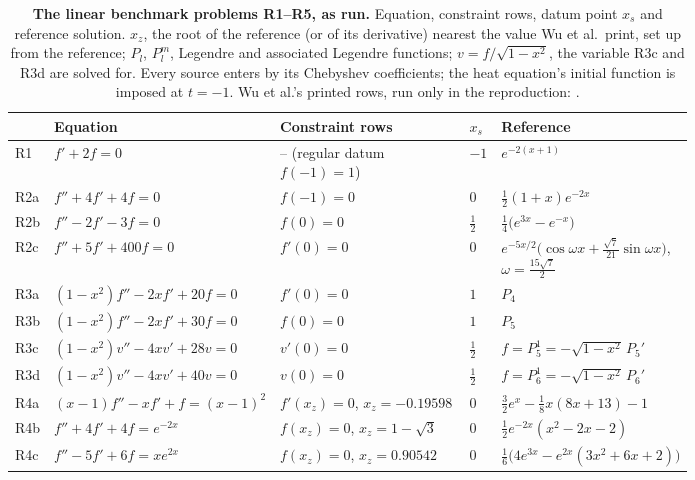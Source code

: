 \begin{table}[htbp]
    \centering
    \caption[The linear benchmark problems R1--R5]{\textbf{The linear benchmark problems R1--R5, as run.} Equation, constraint rows, datum point $x_s$ and reference solution. $x_z$, the root of the reference (or of its derivative) nearest the value Wu et al.\ print, set up from the reference; $P_l$, $P_l^m$, Legendre and associated Legendre functions; $v=f/\sqrt{1-x^2}$, the variable R3c and R3d are solved for. Every source enters by its Chebyshev coefficients; the heat equation's initial function is imposed at $t=-1$. Wu et al.'s printed rows, run only in the reproduction: .}
    \label{tab:catalogue-linear}
    \footnotesize
    \begin{tabular}{@{}l p{0.26\linewidth} p{0.29\linewidth} l p{0.24\linewidth}@{}}
        \toprule
        & Equation & Constraint rows & $x_s$ & Reference \\
        \midrule
        R1  & $f' + 2f = 0$ & -- (regular datum $f(-1)=1$) & $-1$ & $e^{-2(x+1)}$ \\
        R2a & $f'' + 4f' + 4f = 0$ & $f(-1) = 0$ & $0$ & $\tfrac12(1+x)e^{-2x}$ \\
        R2b & $f'' - 2f' - 3f = 0$ & $f(0) = 0$ & $\tfrac12$ & $\tfrac14\bigl(e^{3x} - e^{-x}\bigr)$ \\
        R2c & $f'' + 5f' + 400f = 0$ & $f'(0) = 0$ & $0$ & $e^{-5x/2}\bigl(\cos\omega x + \tfrac{\sqrt7}{21}\sin\omega x\bigr)$, $\omega = \tfrac{15\sqrt7}{2}$ \\
        R3a & $(1-x^2)f'' - 2xf' + 20f = 0$ & $f'(0) = 0$ & $1$ & $P_4$ \\
        R3b & $(1-x^2)f'' - 2xf' + 30f = 0$ & $f(0) = 0$ & $1$ & $P_5$ \\
        R3c & $(1-x^2)v'' - 4xv' + 28v = 0$ & $v'(0) = 0$ & $\tfrac12$ & $f = P_5^1 = -\sqrt{1-x^2}\,P_5'$ \\
        R3d & $(1-x^2)v'' - 4xv' + 40v = 0$ & $v(0) = 0$ & $\tfrac12$ & $f = P_6^1 = -\sqrt{1-x^2}\,P_6'$ \\
        R4a & $(x-1)f'' - xf' + f = (x-1)^2$ & $f'(x_z) = 0$, $x_z = -0.19598$ & $0$ & $\tfrac32e^{x} - \tfrac18x(8x+13) - 1$ \\
        R4b & $f'' + 4f' + 4f = e^{-2x}$ & $f(x_z) = 0$, $x_z = 1-\sqrt3$ & $0$ & $\tfrac12e^{-2x}(x^2 - 2x - 2)$ \\
        R4c & $f'' - 5f' + 6f = xe^{2x}$ & $f(x_z) = 0$, $x_z = 0.90542$ & $0$ & $\tfrac16\bigl(4e^{3x} - e^{2x}(3x^2 + 6x + 2)\bigr)$ \\

\end{tabular}
\end{table}
